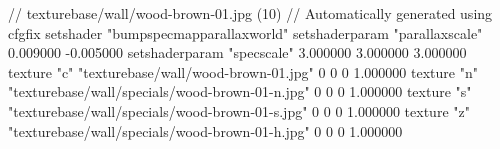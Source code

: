 // texturebase/wall/wood-brown-01.jpg (10)
// Automatically generated using cfgfix
setshader "bumpspecmapparallaxworld"
setshaderparam "parallaxscale" 0.009000 -0.005000
setshaderparam "specscale" 3.000000 3.000000 3.000000
texture "c" "texturebase/wall/wood-brown-01.jpg" 0 0 0 1.000000
texture "n" "texturebase/wall/specials/wood-brown-01-n.jpg" 0 0 0 1.000000
texture "s" "texturebase/wall/specials/wood-brown-01-s.jpg" 0 0 0 1.000000
texture "z" "texturebase/wall/specials/wood-brown-01-h.jpg" 0 0 0 1.000000
